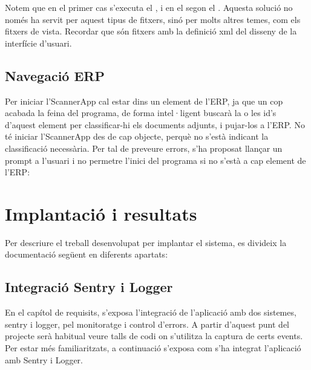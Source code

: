 \documentclass[letterpaper,11pt,catalan]{sphinxmanual}
\begin{document}
Notem que en el primer cas s'executa el , i en el segon el .
Aquesta solució no només ha servit per aquest tipus de fitxers, sinó per molts altres temes,
com els fitxers de vista. Recordar que són fitxers  amb la definició xml del disseny
de la interfície d'usuari.


\section{Navegació ERP}
\label{\detokenize{index:navegacio-erp}}
Per iniciar l'ScannerApp cal estar dins un element de l'ERP, ja que un cop acabada la feina
del programa, de forma intel·ligent buscarà la o les id's d'aquest element per classificar-hi
els documents adjunts, i pujar-los a l'ERP. No té iniciar l'ScannerApp des de
cap objecte, perquè no s'està indicant la classificació necessària. Per tal de preveure errors,
s'ha proposat llançar un prompt a l'usuari i no permetre l'inici del programa si no s'està a cap
element de l'ERP:

\begin{sphinxVerbatim}[commandchars=\\\{\}]
 
 
\end{sphinxVerbatim}


\chapter{Implantació i resultats}
\label{\detokenize{index:implantacio-i-resultats}}
Per descriure el treball desenvolupat per implantar el sistema, es divideix la documentació següent
en diferents apartats:


\section{Integració Sentry i Logger}
\label{\detokenize{index:integracio-sentry-i-logger}}
En el capítol de requisits, s'exposa l'integració de l'aplicació amb dos sistemes, sentry i logger,
pel monitoratge i control d'errors. A partir d'aquest punt del projecte serà habitual veure
talls de codi on s'utilitza la captura de certs events. Per estar més familiaritzats, a continuació
s'exposa com s'ha integrat l'aplicació amb Sentry i Logger.
\end{document}
